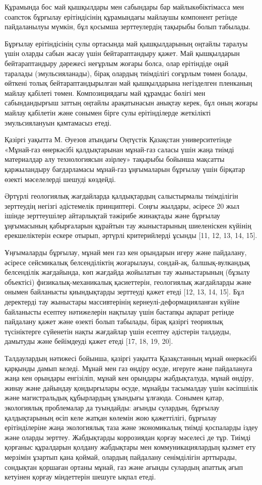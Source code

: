 \begin{multicols}{2}
Құрамында бос май қышқылдары мен сабындары бар майлыкөбіктімасса мен
соапсток бұрғылау ерітіндісінің құрамындағы майлаушы компонент ретінде
пайдаланылуы мүмкін, бұл қосымша зерттеулердің тақырыбы болып табылады.

Бұрғылау ерітіндісінің сулы ортасында май қышқылдарының оңтайлы таралуы
үшін оларды сабын жасау үшін бейтараптандыру қажет. Май қышқылдарын
бейтараптандыру дәрежесі неғұрлым жоғары болса, олар ерітіндіде оңай
таралады (эмульсияланады), бірақ олардың тиімділігі соғұрлым төмен
болады, өйткені толық бейтараптандырылған май қышқылдарына негізделген
пленканың майлау қабілеті төмен. Композициядағы май құрамдас бөлігі мен
сабындандырғыш заттың оңтайлы арақатынасын анықтау керек, бұл оның
жоғары майлау қабілетін және сонымен бірге сулы ерітінділерде жеткілікті
эмульсиялануын қамтамасыз етеді.

Қазіргі уақытта М. Әуезов атындағы Оңтүстік Қазақстан университетінде
«Мұнай-газ өнеркәсібі қалдықтарынан мұнай-газ саласы үшін жаңа тиімді
материалдар алу технологиясын әзірлеу» тақырыбы бойынша мақсатты
қаржыландыру бағдарламасы мұнай-газ ұңғымаларын бұрғылау үшін бірқатар
өзекті мәселелерді шешуді көздейді.

Әртүрлі геологиялық жағдайларда қалдықтардың салыстырмалы тиімділігін
зерттеудің негізгі әдістемелік принциптері. Соңғы жылдары, әсіресе 20
жыл ішінде зерттеушілер айтарлықтай тәжірибе жинақтады және бұрғылау
ұңғымасының қабырғаларын құрайтын тау жыныстарының шиеленіскен күйінің
ерекшеліктерін ескере отырып, әртүрлі критерийлерді ұсынды {[}11, 12,
13, 14, 15{]}.

Ұңғымаларды бұрғылау, мұнай мен газ кен орындарын игеру және пайдалану,
әсіресе сейсмикалық белсенділіктің жоғарылауы, сондай-ақ,
балшық-вулкандық белсенділік жағдайында, көп жағдайда жойылатын тау
жыныстарының (бұзылу объектісі) физикалық-механикалық қасиеттерін,
геологиялық жағдайларды және онымен байланысты қиындықтарды зерттеуді
қажет етеді {[}12, 13, 14, 15{]}. Бұл деректерді тау жыныстары
массивтерінің кернеулі-деформацияланған күйіне байланысты есептеу
нәтижелерін нақтылау үшін бастапқы ақпарат ретінде пайдалану қажет және
өзекті болып табылады, бірақ қазіргі теориялық түсініктерге сүйенетін
нақты жағдайлар үшін есептеу әдістерін талдауды, дамытуды және
бейімдеуді қажет етеді {[}17, 18, 19, 20{]}.

Талдаулардың нәтижесі бойынша, қазіргі уақытта Қазақстанның мұнай
өнеркәсібі қарқынды дамып келеді. Мұнай мен газ өндіру өсуде, игеруге
және пайдалануға жаңа кен орындары енгізіліп, мұнай кен орындары
жабдықталуда, мұнай өндіру, жинау және дайындау қондырғылары өсуде,
мұнайды тасымалдау үшін кәсіпшілік және магистральдық құбырлардың
ұзындығы ұлғаюда. Сонымен қатар, экологиялық проблемалар да туындайды:
ағынды сулардың, бұрғылау қалдықтарының өсіп келе жатқан көлемін жою
қажеттілігі, бұрғылау ерітінділеріне жаңа экологиялық таза және
экономикалық тиімді қоспаларды іздеу және оларды зерттеу. Жабдықтарды
коррозиядан қорғау мәселесі де тұр. Тиімді қорғаныс құралдарын қолдану
жабдықтары мен коммуникациялардың қызмет ету мерзімін ұзартып қана
қоймай, олардың пайдалану сенімділігін арттырады, сондықтан қоршаған
ортаны мұнай, газ және ағынды сулардың апаттық ағып кетуінен қорғау
міндеттерін шешуге ықпал етеді.


\end{multicols}

